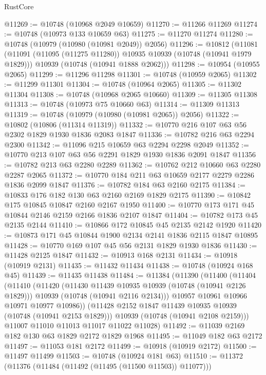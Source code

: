 \begin{lexlean}{RustCore}
\begin{coremodule}
@11269 := @10748 (@10968 @2049 @10659)
@11270 := @11266 @11269
@11274 := @10748 (@10973 @133 @10659 @63)
@11275 := @11270 @11274
@11280 := @10748 (@10979 (@10980 (@10981 @2049)) @2056)
@11296 := @10812
    (@11081
      (@11091 (@11095 (@11275 @11280)) @10935 @10939 (@10748 (@10941 @1979 @1829)))
      @10939
      (@10748 (@10941 @1888 @2062)))
@11298 := @10954 (@10955 @2065)
@11299 := @11296 @11298
@11301 := @10748 (@10959 @2065)
@11302 := @11299 @11301
@11304 := @10748 (@10964 @2065)
@11305 := @11302 @11304
@11308 := @10748 (@10968 @2065 @10660)
@11309 := @11305 @11308
@11313 := @10748 (@10973 @75 @10660 @63)
@11314 := @11309 @11313
@11319 := @10748 (@10979 (@10980 (@10981 @2065)) @2056)
@11322 := @10802 (@10806 (@11314 @11319))
@11332 := @10770 @216 @107 @63 @56 @2302 @1829 @1930 @1836 @2083 @1847
@11336 := @10782 @216 @63 @2294 @2300
@11342 := @11096 @215 @10659 @63 @2294 @2298 @2049
@11352 := @10770 @213 @107 @63 @56 @2291 @1829 @1930 @1836 @2091 @1847
@11356 := @10782 @213 @63 @2280 @2289
@11362 := @10762 @212 @10660 @63 @2280 @2287 @2065
@11372 := @10770 @184 @211 @63 @10659 @2177 @2279 @2286 @1836 @2099 @1847
@11376 := @10782 @184 @63 @2160 @2175
@11384 := @10833 @176 @182 @130 @63 @2160 @2169 @1829 @2175
@11390 := @10842 @175 @10845 @10847 @2160 @2167 @1950
@11400 := @10770 @173 @171 @45 @10844 @2146 @2159 @2166 @1836 @2107 @1847
@11404 := @10782 @173 @45 @2135 @2144
@11410 := @10866 @172 @10845 @45 @2135 @2142 @1920
@11420 := @10873 @171 @45 @10844 @1900 @2134 @2141 @1836 @2115 @1847 @10895
@11428 := @10770 @169 @107 @45 @56 @2131 @1829 @1930 @1836
@11430 := @11428 @2125 @1847
@11432 := @10913 @168 @2131
@11434 := @10918 (@10919 @2131)
@11435 := @11432 @11434
@11438 := @10748 (@10924 @168 @45)
@11439 := @11435 @11438
@11484 := @11384
    (@11390
      (@11400
        (@11404
          (@11410
            (@11420
              (@11430 @11439 @10935 @10939 (@10748 (@10941 @2126 @1829)))
              @10939
              (@10748 (@10941 @2116 @2134)))
            @10957
            @10961
            @10966
            @10971
            @10977
            @10986))
        (@11428 @2152 @1847 @11439 @10935 @10939 (@10748 (@10941 @2153 @1829)))
        @10939
        (@10748 (@10941 @2108 @2159)))
      @11007
      @11010
      @11013
      @11017
      @11022
      @11028)
@11492 := @11039 @2169 @182 @130 @63 @1829 @2172 @1829 @1968
@11495 := @11049 @182 @63 @2172
@11497 := @11053 @181 @2172
@11499 := @10918 (@10919 @2172)
@11500 := @11497 @11499
@11503 := @10748 (@10924 @181 @63)
@11510 := @11372 (@11376 (@11484 (@11492 (@11495 (@11500 @11503)) @11077)))

\end{coremodule}
\end{lexlean}
